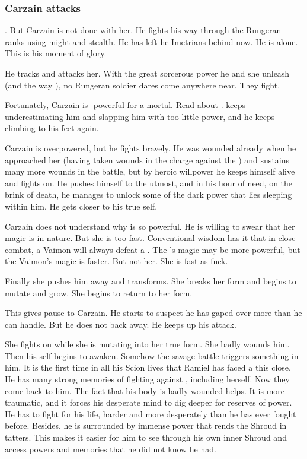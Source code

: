 \subsubsection{Carzain attacks \Takestsha}
\Takestsha {}. 
But Carzain is not done with her.
He fights his way through the Rungeran ranks using might and stealth.
He has left he Imetrians behind now. 
He is alone. 
This is his moment of glory. 

He tracks \Takestsha and attacks her. 
With the great sorcerous power he and she unleash (and the way ), no Rungeran soldier dares come anywhere near. 
They fight. 

Fortunately, Carzain is \uber-powerful for a mortal. 
Read about . 
\Takestsha keeps underestimating him and slapping him with too little power, and he keeps climbing to his feet again. 

Carzain is overpowered, but he fights bravely. 
He was wounded already when he approached her (having taken wounds in the charge against the \ishrah) and sustains many more wounds in the battle, but by heroic willpower he keeps himself alive and fights on. 
He pushes himself to the utmost, and in his hour of need, on the brink of death, he manages to unlock some of the dark power that lies sleeping within him. 
He gets closer to his true self. 

Carzain does not understand why \Takestsha is so powerful.
He is willing to swear that her magic is \rethyactic in nature.
But she is too fast. 
Conventional wisdom has it that in close combat, a Vaimon will always defeat a \rethyax. 
The \rethyax's magic may be more powerful, but the Vaimon's magic is faster. 
But not her. 
She is fast as fuck. 

Finally she pushes him away and transforms. 
She breaks her \human form and begins to mutate and grow. 
She begins to return to her \draconian form.

This gives pause to Carzain. 
He starts to suspect he has gaped over more than he can handle. 
But he does not back away.
He keeps up his attack. 

She fights on while she is mutating into her true form. 
She badly wounds him. 
Then his \malach self begins to awaken. 
Somehow the savage battle triggers something in him.
It is the first time in all his Scion lives that Ramiel has faced a \dragon this close. 
He has many strong memories of fighting against \dragons, including \Nzessuacrith herself. 
Now they come back to him. 
The fact that his body is badly wounded helps. 
It is more traumatic, and it forces his desperate mind to dig deeper for reserves of power. 
He has to fight for his life, harder and more desperately than he has ever fought before. 
Besides, he is surrounded by immense power that rends the Shroud in tatters. 
This makes it easier for him to see through his own inner Shroud and access powers and memories that he did not know he had. 

